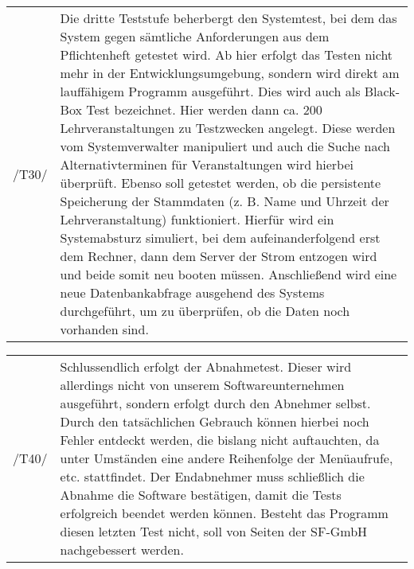\begin{tabular}{p{1.5cm}p{14.5cm}}
 /T30/	& Die dritte Teststufe beherbergt den Systemtest, bei dem das System gegen sämtliche Anforderungen aus dem Pflichtenheft getestet wird. Ab hier erfolgt das Testen nicht mehr in der Entwicklungsumgebung, sondern wird direkt am lauffähigem Programm ausgeführt. Dies wird auch als Black-Box Test bezeichnet.
Hier werden dann ca. 200 Lehrveranstaltungen zu Testzwecken angelegt. Diese werden vom Systemverwalter manipuliert und auch die Suche nach Alternativterminen für Veranstaltungen wird hierbei überprüft. Ebenso soll getestet werden, ob die persistente Speicherung der Stammdaten (z. B. Name und Uhrzeit der Lehrveranstaltung) funktioniert. Hierfür wird ein Systemabsturz simuliert, bei dem aufeinanderfolgend erst dem Rechner, dann dem Server der Strom entzogen wird und beide somit neu booten müssen. Anschließend wird eine neue Datenbankabfrage ausgehend des Systems durchgeführt, um zu überprüfen, ob die Daten noch vorhanden sind. \\[0.25cm]	 
\end{tabular}

\begin{tabular}{p{1.5cm}p{14.5cm}}
 /T40/	& Schlussendlich erfolgt der Abnahmetest. Dieser wird allerdings nicht von unserem Softwareunternehmen ausgeführt, sondern erfolgt durch den Abnehmer selbst. Durch den tatsächlichen Gebrauch können hierbei noch Fehler entdeckt werden, die bislang nicht auftauchten, da unter Umständen eine andere Reihenfolge der Menüaufrufe, etc. stattfindet. Der Endabnehmer muss schließlich die Abnahme die Software bestätigen, damit die Tests erfolgreich beendet werden können. Besteht das Programm diesen letzten Test nicht, soll von Seiten der SF-GmbH  nachgebessert werden. \\[0.25cm]	 
\end{tabular}